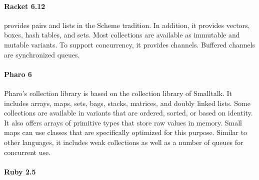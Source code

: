 \documentclass[sigconf, 10pt]{acmart}
\begin{document}

\paragraph{Racket 6.12}

 provides pairs and lists in the Scheme tradition.
In addition, it provides vectors, boxes, hash tables, and sets.
Most collections are available as immutable and mutable variants.
To support concurrency, it provides channels.
Buffered channels are synchronized queues.

\paragraph{Pharo 6}
Pharo's collection library is based on the collection library
of Smalltalk\citep{Smalltalk80,Cook:1992:ISS}.
It includes arrays, maps, sets, bags, stacks, matrices, and doubly linked lists.
Some collections are available in variants that are ordered, sorted,
or based on identity.
It also offers arrays of primitive types that store raw values in memory.
Small maps can use classes that are specifically optimized for this purpose.
Similar to other languages,
it includes weak collections as well as a number of queues for concurrent use.

\paragraph{Ruby 2.5}
\end{document}
